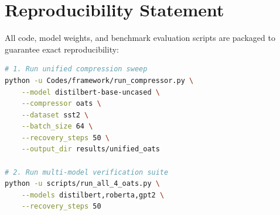\section{Reproducibility Statement}
All code, model weights, and benchmark evaluation scripts are packaged to guarantee exact reproducibility:
\begin{lstlisting}[language=bash]
# 1. Run unified compression sweep
python -u Codes/framework/run_compressor.py \
    --model distilbert-base-uncased \
    --compressor oats \
    --dataset sst2 \
    --batch_size 64 \
    --recovery_steps 50 \
    --output_dir results/unified_oats

# 2. Run multi-model verification suite
python -u scripts/run_all_4_oats.py \
    --models distilbert,roberta,gpt2 \
    --recovery_steps 50
\end{lstlisting}
